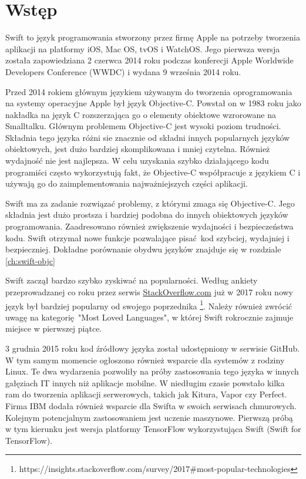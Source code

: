 \documentclass[mgr, shortabstract]{iithesis}
\author         {Maksymilian Debeściak}
\begin{document}

\chapter{Wstęp}
\label{ch:wstep}

Swift to język programowania stworzony przez firmę Apple na potrzeby tworzenia aplikacji na platformy iOS, Mac OS, tvOS i WatchOS. Jego pierwsza wersja została zapowiedziana 2 czerwca 2014 roku podczas konferecji Apple Worldwide Developers Conference (WWDC) i wydana 9 września 2014 roku.

Przed 2014 rokiem głównym językiem używanym do tworzenia oprogramowania na systemy operacyjne Apple był język Objective-C. Powstał on w 1983 roku jako nakładka na język C rozszerzająca go o elementy obiektowe wzrorowane na Smalltalku. Głównym problemem Objective-C jest wysoki poziom trudności. Składnia tego języka różni sie znacznie od składni innych popularnych języków obiektowych, jest dużo bardziej skomplikowana i mniej czytelna. Również wydajność nie jest najlepsza. W celu uzyskania szybko działającego kodu programiści często wykorzystują fakt, że Objective-C współpracuje z językiem C i używają go do zaimplementowania najważniejszych części aplikacji. 

Swift ma za zadanie rozwiązać problemy, z którymi zmaga się Objective-C. Jego składnia jest dużo prostsza i bardziej podobna do innych obiektowych języków programowania. Zaadresowano również zwiększenie wydajności i bezpieczeństwa kodu. Swift otrzymał nowe funkcje pozwalające pisać kod szybciej, wydajniej i bezpieczniej. Dokładne porównanie obydwu języków znajduje się w rozdziale \ref{ch:swift-objc}

Swift zaczął bardzo szybko zyskiwać na popularności. Według ankiety przeprowadzanej co roku przez serwis \url{StackOverflow.com} już w 2017 roku nowy język był bardziej popularny od swojego poprzednika \footnote{https://insights.stackoverflow.com/survey/2017\#most-popular-technologies}. Należy również zwrócić uwagę na kategorię "Most Loved Languages", w której Swift rokrocznie zajmuje miejsce w pierwszej piątce.

3 grudnia 2015 roku kod źródłowy języka został udostępniony w serwisie GitHub. W tym samym momencie ogłoszono również wsparcie dla systemów z rodziny Linux. Te dwa wydarzenia pozwoliły na próby zastosowania tego języka w innych gałęziach IT innych niż aplikacje mobilne. W niedługim czasie powstało kilka ram do tworzenia aplikacji serwerowych, takich jak Kitura, Vapor czy Perfect. Firma IBM dodała również wsparcie dla Swifta w swoich serwisach chmurowych. Kolejnym potencjalnym zastosowaniem jest uczenie maszynowe. Pierwszą próbą w tym kierunku jest wersja platformy TensorFlow wykorzystująca Swift (Swift for TensorFlow).
\end{document}

